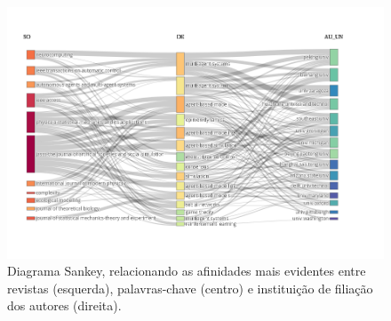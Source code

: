 \begin{figure}
    \centering
    \includegraphics[angle=90,width=1\textwidth,height=0.9\textheight]{exploratory-data-analysis/jhcf/PesqBibliogr/SimulacaoMultiagente/WoS-20220203/Descritiva/MASSA2-Three-Fields-Plot-SO-DE-AU_UN.png}
    \caption{Diagrama Sankey, relacionando as afinidades mais evidentes entre revistas (esquerda), palavras-chave (centro) e instituição de filiação dos autores (direita).}
    \label{fig:MASSA2:Sankey:SO:DE:AU_UN}
\end{figure}

